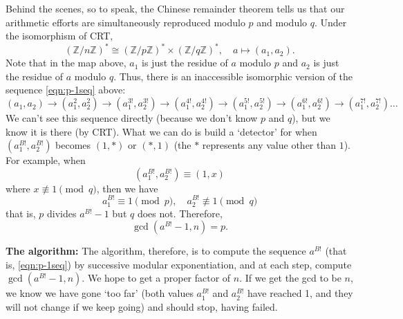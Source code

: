 \documentclass{article}
\theoremstyle{plain}
\theoremstyle{definition}
\theoremstyle{remark}
\numberwithin{theorem}{section}
\newcommand{\ZZ}{\mathbb{Z}}
\begin{document}
Behind the scenes, so to speak, the Chinese remainder theorem tells us that our arithmetic efforts are simultaneously reproduced modulo $p$ and modulo $q$.  Under the isomorphism of CRT,
\[
(\ZZ/n\ZZ)^* \cong (\ZZ/p\ZZ)^* \times (\ZZ/q\ZZ)^*, \quad a \mapsto (a_1,a_2).
\]
Note that in the map above, $a_1$ is just the residue of $a$ modulo $p$ and $a_2$ is just the residue of $a$ modulo $q$.
Thus, there is an inaccessible isomorphic version of the sequence \eqref{eqn:p-1seq} above:
\[
(a_1,a_2) \rightarrow (a_1^2, a_2^2)
\rightarrow (a_1^{3!}, a_2^{3!})
\rightarrow (a_1^{4!}, a_2^{4!})
\rightarrow (a_1^{5!}, a_2^{5!})
\rightarrow (a_1^{6!}, a_2^{6!})
\rightarrow (a_1^{7!}, a_2^{7!}) \ldots
\]
We can't see this sequence directly (because we don't know $p$ and $q$), but we know it is there (by CRT).  What we can do is 
build a `detector' for when $(a_1^{B!},a_2^{B!})$ becomes $(1,*)$ or $(*,1)$ (the $*$ represents any value other than $1$).  For example, when
\[
(a_1^{B!}, a_2^{B!}) \equiv (1, x)
\]
where $x \not\equiv 1 \pmod q$, then we have
\[
a_1^{B!} \equiv 1 \pmod{p}, \quad a_2^{B!} \not\equiv 1 \pmod{q}
\]
that is, $p$ divides $a^{B!}-1$ but $q$ does not.  Therefore,
\[
\gcd(a^{B!}-1, n) = p.
\]

\textbf{The algorithm:}  
The algorithm, therefore, is to compute the sequence $a^{B!}$ (that is, \eqref{eqn:p-1seq}) by successive modular exponentiation, and at each step, compute $\gcd(a^{B!}-1,n)$.  We hope to get a proper factor of $n$.  If we get the gcd to be $n$, we know we have gone `too far' (both values $a_1^{B!}$ and $a_2^{B!}$ have reached 1, and they will not change if we keep going) and should stop, having failed.
\end{document}
